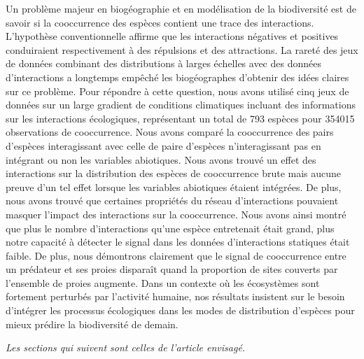 Un problème majeur en biogéographie et en modélisation de la biodiversité
est de savoir si la cooccurrence des espèces contient une trace des
interactions. L'hypothèse conventionnelle affirme que les interactions
négatives et positives conduiraient respectivement à des répulsions et
des attractions. La rareté des jeux de données combinant des distributions
à larges échelles avec des données d'interactions a longtemps empêché
les biogéographes d'obtenir des idées claires sur ce problème. Pour répondre
à cette question, nous avons utilisé cinq jeux de données sur un large
gradient de conditions climatiques incluant des informations sur les interactions écologiques,
représentant un total de 793 espèces pour 354015 observations de cooccurrence.
Nous avons comparé la cooccurrence des pairs d'espèces interagissant avec
celle de paire d'espèces n'interagissant pas en intégrant ou non les
variables abiotiques. Nous avons trouvé un effet des interactions sur la
distribution des espèces de cooccurrence brute mais aucune preuve d'un tel
effet lorsque les variables abiotiques étaient intégrées. De plus, nous avons
trouvé que certaines propriétés du réseau d'interactions pouvaient masquer l'impact
des interactions sur la cooccurrence. Nous avons ainsi montré que plus le nombre
d'interactions qu'une espèce entretenait était grand, plus notre capacité
à détecter le signal dans les données d'interactions statiques était faible.
De plus, nous démontrons clairement que le signal de cooccurrence entre un
prédateur et ses proies disparaît quand la proportion de sites couverts par
l'ensemble de proies augmente. Dans un contexte où les écosystèmes sont
fortement perturbés par l'activité humaine, nos résultats insistent
sur le besoin d'intégrer les processus écologiques dans les
modes de distribution d'espèces pour mieux prédire la biodiversité de demain.






\emph{Les sections qui suivent sont celles de l'article envisagé.}


\newpage
